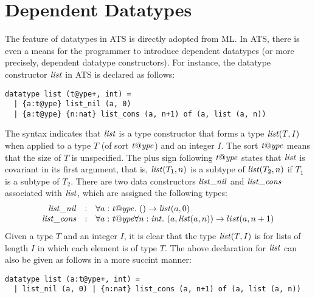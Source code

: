 \section{Dependent Datatypes}\label{section:dependent_datatypes}
The feature of datatypes in ATS is directly adopted from ML. In ATS, there
is even a means for the programmer to introduce dependent datatypes (or
more precisely, dependent datatype constructors). For instance, the
datatype constructor ${\it list}$ in ATS is declared as follows:
\begin{verbatim}
datatype list (t@ype+, int) =
  | {a:t@ype} list_nil (a, 0)
  | {a:t@ype} {n:nat} list_cons (a, n+1) of (a, list (a, n))
\end{verbatim}
The syntax indicates that ${\it list}$ is a type constructor that forms a type
${\it list}(T,I)$ when applied to a type $T$ (of sort ${\it t@ype}$) and an
integer $I$. The sort ${\it t@ype}$ means that the size of $T$ is
unspecified. The plus sign following ${\it t@ype}$ states that ${\it list}$ is
covariant in its first argument, that is, ${\it list}(T_1, n)$ is a subtype of
${\it list}(T_2, n)$ if $T_1$ is a subtype of $T_2$. There are two data
constructors ${\it list\_nil}$ and ${\it list\_cons}$ associated with
${\it list}$, which are assigned the following types:
\[\begin{array}{rcl}
{\it list\_nil} & : & \forall a:{\it t@ype}.~() \rightarrow {\it list} (a, 0) \\
{\it list\_cons} & : & \forall a:{\it t@ype}\forall n:{\it int}.~(a, {\it list}(a, n)) \rightarrow list (a, n+1) \\
\end{array}\]
Given a type $T$ and an integer $I$, it is clear that the type
${\it list}(T,I)$ is for lists of length $I$ in which each element is of type
$T$. The above declaration for ${\it list}$ can also be given as follows in a
more succint manner:
\begin{verbatim}
datatype list (a:t@ype+, int) =
  | list_nil (a, 0) | {n:nat} list_cons (a, n+1) of (a, list (a, n))
\end{verbatim}

